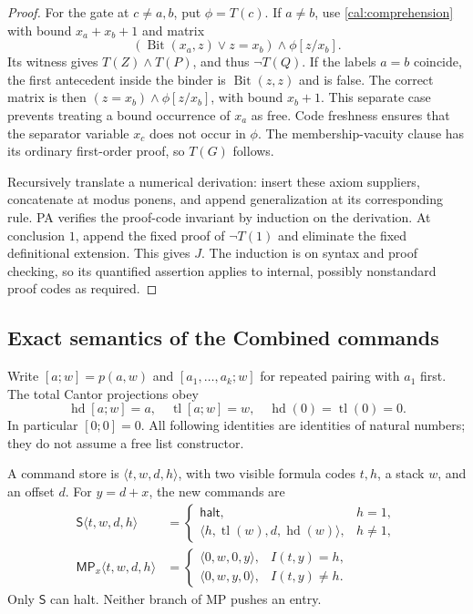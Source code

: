 \begin{proof}
For the gate at $c\ne a,b$, put $\phi=T(c)$.  If $a\ne b$, use
\eqref{cal:comprehension} with bound $x_a+x_b+1$ and matrix
\[
  (\operatorname{Bit}(x_a,z)\lor z=x_b)\wedge\phi[z/x_b].
\]
Its witness gives $T(Z)\wedge T(P)$, and thus $\neg T(Q)$.
If the labels $a=b$ coincide, the first antecedent inside the binder
is $\operatorname{Bit}(z,z)$ and is false.  The correct matrix is then
$(z=x_b)\wedge\phi[z/x_b]$, with bound $x_b+1$.
This separate case prevents treating a bound occurrence of $x_a$ as
free.  Code freshness ensures that the separator variable $x_c$ does
not occur in $\phi$.  The membership-vacuity clause has its ordinary
first-order proof, so $T(G)$ follows.

Recursively translate a numerical derivation: insert these axiom
suppliers, concatenate at modus ponens, and append generalization at
its corresponding rule.  PA verifies the proof-code invariant by
induction on the derivation.  At conclusion $1$, append the fixed proof
of $\neg T(1)$ and eliminate the fixed definitional extension.  This
gives $J$.  The induction is on syntax and proof checking, so its
quantified assertion applies to internal, possibly nonstandard proof
codes as required.
\end{proof}

\subsection{Exact semantics of the Combined commands}
\label{cal:commands}

Write $[a;w]=p(a,w)$ and $[a_1,\ldots,a_k;w]$ for repeated pairing
with $a_1$ first.  The total Cantor projections obey
\[
 \operatorname{hd}[a;w]=a,\quad
 \operatorname{tl}[a;w]=w,\quad
 \operatorname{hd}(0)=\operatorname{tl}(0)=0.
\]
In particular $[0;0]=0$.  All following identities are identities of
natural numbers; they do not assume a free list constructor.

A command store is $\langle t,w,d,h\rangle$, with two visible formula
codes $t,h$, a stack $w$, and an offset $d$.  For $y=d+x$, the new
commands are
\begin{align*}
 \mathsf S\langle t,w,d,h\rangle
 &=\begin{cases}
     \mathsf{halt},&h=1,\\
     \langle h,\operatorname{tl}(w),d,\operatorname{hd}(w)\rangle,&h\ne1,
   \end{cases}\\
 \mathsf{MP}_x\langle t,w,d,h\rangle
 &=\begin{cases}
     \langle0,w,0,y\rangle,&I(t,y)=h,\\
     \langle0,w,y,0\rangle,&I(t,y)\ne h.
   \end{cases}
\end{align*}
Only $\mathsf S$ can halt.  Neither branch of MP pushes an entry.

